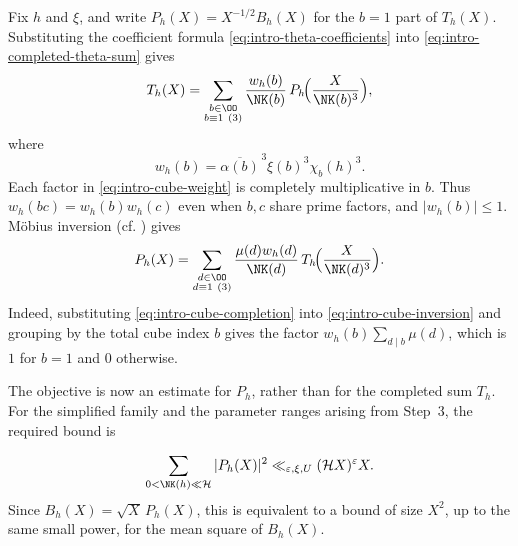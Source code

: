 Fix $h$ and $\xi$, and write $P_h(X)=X^{-1/2}B_h(X)$ for the $b=1$ part of $T_h(X)$. Substituting the coefficient formula \eqref{eq:intro-theta-coefficients} into \eqref{eq:intro-completed-theta-sum} gives
\begin{equation}\label{eq:intro-cube-completion}
 T_h(X)=\sum_{\substack{b\in\OO\\b\equiv1\ (3)}}\frac{w_h(b)}{\NK(b)}\,
                  P_h\!\Bigl(\frac{X}{\NK(b)^3}\Bigr),
\end{equation}
where
\begin{equation}\label{eq:intro-cube-weight}
 w_h(b)=\overline{\alpha(b)}^{\,3}\xi(b)^3\chi_b(h)^3.
\end{equation}
Each factor in \eqref{eq:intro-cube-weight} is completely multiplicative in $b$. Thus $w_h(bc)=w_h(b)w_h(c)$ even when $b,c$ share prime factors, and $|w_h(b)|\le1$. M\"obius inversion (cf. \cite[\S1.3]{IK04}) gives
\begin{equation}\label{eq:intro-cube-inversion}
 P_h(X)=\sum_{\substack{d\in\OO\\d\equiv1\ (3)}}\frac{\mu(d)w_h(d)}{\NK(d)}\,
                  T_h\!\Bigl(\frac{X}{\NK(d)^3}\Bigr).
\end{equation}
Indeed, substituting \eqref{eq:intro-cube-completion} into \eqref{eq:intro-cube-inversion} and grouping by the total cube index $b$ gives the factor $w_h(b)\sum_{d\mid b}\mu(d)$, which is $1$ for $b=1$ and $0$ otherwise.


The objective is now an estimate for $P_h$, rather than for the
completed sum $T_h$. For the simplified family and the parameter
ranges arising from Step~3, the required bound is

\begin{equation}\label{eq:intro-cube-target}
 \sum_{0<\NK(h)\ll\mathcal H}|P_h(X)|^2
       \ll_{\varepsilon,\xi,U}(\mathcal H X)^\varepsilon X.
\end{equation}
Since $B_h(X)=\sqrt X\,P_h(X)$, this is equivalent to a bound of size $X^2$, up to the same small power, for the mean square of $B_h(X)$.

